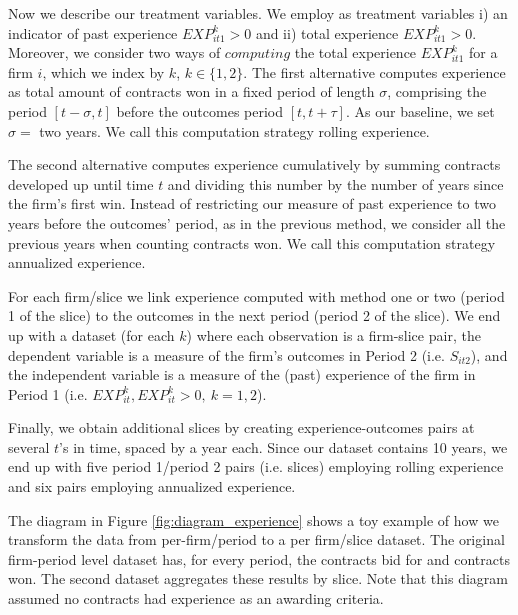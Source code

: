 Now we describe our treatment variables. We employ as treatment variables  i) an indicator of past experience $EXP^k_{it1}>0$ and ii) total experience $EXP^k_{it1}>0$. Moreover, we consider two ways of $computing$ the total experience $EXP^k_{it1}$ for a firm $i$, which we index by $k$, $k\in \{1,2\}$. The first alternative computes experience as total amount of contracts won in a fixed period of length $\sigma$, comprising the period $[t-\sigma,t]$ before the outcomes period $[t,t+\tau]$. As our baseline, we set $\sigma=$ two years. We call this computation strategy rolling experience.

The second alternative computes experience cumulatively by summing contracts developed up until time $t$ and dividing this number by the number of years since the firm's first win. Instead of restricting our measure of past experience to two years before the outcomes' period, as in the previous method, we consider all the previous years when counting contracts won. We call this computation strategy annualized experience.

For each firm/slice we link experience computed with method one or two (period 1 of the slice) to the outcomes in the next period (period 2 of the slice). We end up with a dataset (for each $k$) where each observation is a firm-slice pair, the dependent variable is a measure of the firm’s outcomes in Period 2 (i.e. $S_{it2}$), and the independent variable is a measure of the (past) experience of the firm in Period 1 (i.e. $EXP^k_{it}, EXP^k_{it}>0,\ k=1,2$).

Finally, we obtain additional slices by creating experience-outcomes pairs at several $t$'s in time, spaced by a year each. Since our dataset contains 10 years, we end up with five period 1/period 2 pairs (i.e. slices) employing rolling experience and six pairs employing annualized experience.


The diagram in Figure \ref{fig:diagram_experience} shows a toy example of how we transform the data from per-firm/period to a per firm/slice dataset. The original firm-period level dataset has, for every period, the contracts bid for and contracts won. The second dataset aggregates these results by slice. Note that this diagram assumed no contracts had experience as an awarding criteria. %

